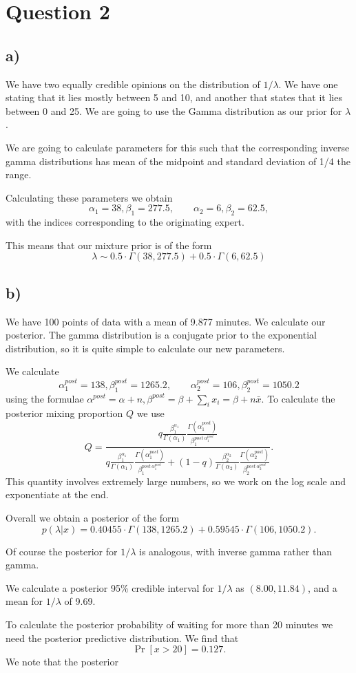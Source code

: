 \documentclass[12pt]{extarticle}
\begin{document}
\section*{Question 2}

\subsection*{a)}

We have two equally credible opinions on the distribution of $1/\lambda$. We have one stating that it lies mostly between 5 and 10, and another that states that it lies between 0 and 25. We are going to use the Gamma distribution as our prior for $\lambda$. 

We are going to calculate parameters for this such that the corresponding inverse gamma distributions has mean of the midpoint and standard deviation of 1/4 the range. 

Calculating these parameters we obtain 
\[
\alpha_1 = 38, \beta_1 = 277.5, \qquad \alpha_2 = 6, \beta_2 = 62.5,
\]
with the indices corresponding to the originating expert.

This means that our mixture prior is of the form 
\[
\lambda \sim 0.5\cdot\Gamma(38, 277.5) + 0.5\cdot\Gamma(6, 62.5)
\]

\subsection*{b)}

We have 100 points of data with a mean of 9.877 minutes. We calculate our posterior. The gamma distribution is a conjugate prior to the exponential distribution, so it is quite simple to calculate our new parameters. 

We calculate 
\[
\alpha_1^{post} = 138, \beta_1^{post} = 1265.2, \qquad \alpha_2^{post} = 106, \beta_2^{post} = 1050.2
\] using the formulae $\alpha^{post} = \alpha + n, \beta^{post} = \beta + \sum_i x_i = \beta + n\bar{x}.$ To calculate the posterior mixing proportion $Q$ we use \[Q = \frac{q\frac{\beta_1^{\alpha_1}}{\Gamma(\alpha_1)}\frac{\Gamma(\alpha_1^{post})}{\beta_1^{post \ \alpha_1^{post}}}}{q\frac{\beta_1^{\alpha_1}}{\Gamma(\alpha_1)}\frac{\Gamma(\alpha_1^{post})}{\beta_1^{post \ \alpha_1^{post}}} + (1-q)\frac{\beta_2^{\alpha_2}}{\Gamma(\alpha_2)}\frac{\Gamma(\alpha_2^{post})}{\beta_2^{post \ \alpha_2^{post}}}}.\]
This quantity involves extremely large numbers, so we work on the log scale and exponentiate at the end. 

Overall we obtain a posterior of the form
\[
p(\lambda|x) = 0.40455 \cdot \Gamma(138, 1265.2) + 0.59545 \cdot \Gamma(106, 1050.2). 
\]

Of course the posterior for $1/\lambda$ is analogous, with inverse gamma rather than gamma.

We calculate a posterior 95\% credible interval for $1/\lambda$ as $(8.00, 11.84)$, and a mean for $1/\lambda$ of 9.69.

To calculate the posterior probability of waiting for more than 20 minutes we need the posterior predictive distribution. We find that $$\Pr[x>20] = 0.127.$$ We note that the posterior 
\end{document}
